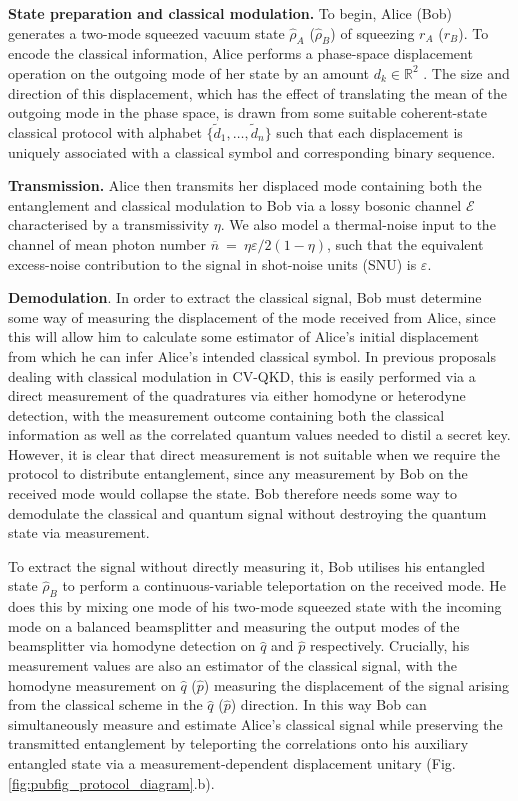 \documentclass[%
 reprint,
 superscriptaddress,
 amsmath,
 amssymb,
 aps,
 pra,
]{revtex4-2}
\begin{document}
\textbf{State preparation and classical modulation.} To begin, Alice (Bob) generates a two-mode squeezed vacuum state $\hat \rho_{A}$ ($\hat \rho_{B}$) of squeezing $r_A$ ($r_B$). To encode the classical information, Alice performs a phase-space displacement operation on the outgoing mode of her state by an amount $ d_k \in \mathbb{R}^2$ \cite{qi_simultaneous_2016, qi_noise_2018, zaunders_enhanced_2025}. The size and direction of this displacement, which has the effect of translating the mean of the outgoing mode in the phase space, is drawn from some suitable coherent-state classical protocol with alphabet $\{\tilde d_1, \dots, \tilde d_n \}$ such that each displacement is uniquely associated with a classical symbol and corresponding binary sequence.

\textbf{Transmission.} Alice then transmits her displaced mode containing both the entanglement and classical modulation to Bob via a lossy bosonic channel $\mathcal{E}$ characterised by a transmissivity $\eta$. We also model a thermal-noise input to the channel of mean photon number $\overline{n}~=~\eta \varepsilon / 2(1 - \eta)$, such that the equivalent excess-noise contribution to the signal in shot-noise units (SNU) is $\varepsilon$.

\textbf{Demodulation}. In order to extract the classical signal, Bob must determine some way of measuring the displacement of the mode received from Alice, since this will allow him to calculate some estimator of Alice's initial displacement from which he can infer Alice's intended classical symbol. In previous proposals \cite{qi_noise_2018, zaunders_enhanced_2025} dealing with classical modulation in CV-QKD, this is easily performed via a direct measurement of the quadratures via either homodyne or heterodyne detection, with the measurement outcome containing both the classical information as well as the correlated quantum values needed to distil a secret key. However, it is clear that direct measurement is not suitable when we require the protocol to distribute entanglement, since any measurement by Bob on the received mode would collapse the state. Bob therefore needs some way to demodulate the classical and quantum signal without destroying the quantum state via measurement.

To extract the signal without directly measuring it, Bob utilises his entangled state $\hat \rho_B$ to perform a continuous-variable teleportation \cite{braunstein_quantum_2005} on the received mode. He does this by mixing one mode of his two-mode squeezed state with the incoming mode on a balanced beamsplitter and measuring the output modes of the beamsplitter via homodyne detection on $\hat q$ and $\hat p$ respectively. Crucially, his measurement values are also an estimator of the classical signal, with the homodyne measurement on $\hat q$ ($\hat p$) measuring the displacement of the signal arising from the classical scheme in the $\hat q$ ($\hat p$) direction. In this way Bob can simultaneously measure and estimate Alice's classical signal while preserving the transmitted entanglement by teleporting the correlations onto his auxiliary entangled state via a measurement-dependent displacement unitary (Fig. \ref{fig:pubfig_protocol_diagram}.b).
\end{document}
